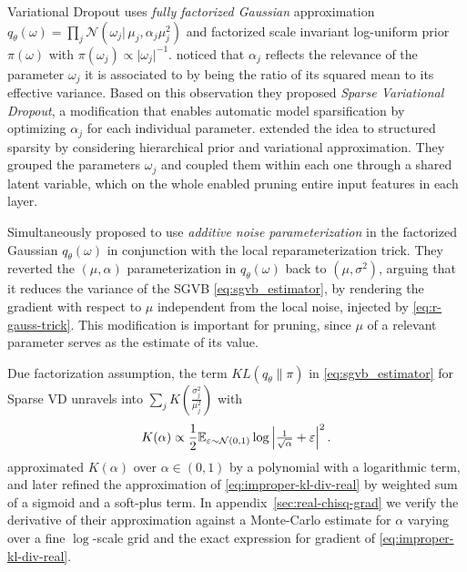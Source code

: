 \documentclass[a4paper,10pt,twocolumn]{article}
\begin{document}
Variational Dropout uses \emph{fully factorized Gaussian} approximation $
  q_\theta(\omega)
    = \prod_j \mathcal{N}(\omega_j \vert\, \mu_j, \alpha_j \mu_j^2)
$ and factorized scale invariant log-uniform prior $\pi(\omega)$ with $
  \pi(\omega_j) \propto \lvert \omega_j \rvert^{-1}
$. \citet{molchanov_variational_2017} noticed that $\alpha_j$ reflects the relevance of the
parameter $\omega_j$ it is associated to by being the ratio of its squared mean to its
effective variance. Based on this observation they proposed \emph{Sparse Variational Dropout},
a modification that enables automatic model sparsification by optimizing $\alpha_j$ for each
individual parameter. \citet{louizos_bayesian_2017} extended the idea to structured sparsity
by considering hierarchical prior and variational approximation. They grouped the parameters
$\omega_j$ and coupled them within each one through a shared latent variable, which on the
whole enabled pruning entire input features in each layer.

Simultaneously \citet{molchanov_variational_2017} proposed to use \emph{additive noise
parameterization} in the factorized Gaussian $q_\theta(\omega)$ in conjunction with the
local reparameterization trick. They reverted the $(\mu, \alpha)$ parameterization in
$q_\theta(\omega)$ back to $(\mu, \sigma^2)$, arguing that it reduces the variance of the
SGVB \eqref{eq:sgvb_estimator}, by rendering the gradient with respect to $\mu$ independent
from the local noise, injected by \eqref{eq:r-gauss-trick}. This modification is important
for pruning, since $\mu$ of a relevant parameter serves as the estimate of its value.

Due factorization assumption, the term $KL(q_\theta \| \pi)$ in \eqref{eq:sgvb_estimator}
for Sparse VD unravels into $
  \sum_j K(\tfrac{\sigma^2_{j}}{\mu_{j}^2})
$ with
\begin{equation}  \label{eq:improper-kl-div-real}
  K(\alpha)
    \propto \frac12 \mathbb{E}_{\varepsilon \sim \mathcal{N}(0, 1)}
        \log{\Bigl\lvert \tfrac1{\sqrt{\alpha}} + \varepsilon \Bigr\rvert^2}
  \,.
\end{equation}
\citet{kingma_variational_2015} approximated $K(\alpha)$ over $\alpha \in (0, 1)$ by a
polynomial with a logarithmic term, and later \citet{molchanov_variational_2017} refined
the approximation of \eqref{eq:improper-kl-div-real} by weighted sum of a sigmoid and a
soft-plus term.
In appendix~\ref{sec:real-chisq-grad} we verify the derivative of their approximation
against a Monte-Carlo estimate for $\alpha$ varying over a fine $\log$-scale grid and
the exact expression for gradient of \eqref{eq:improper-kl-div-real}.
\end{document}
